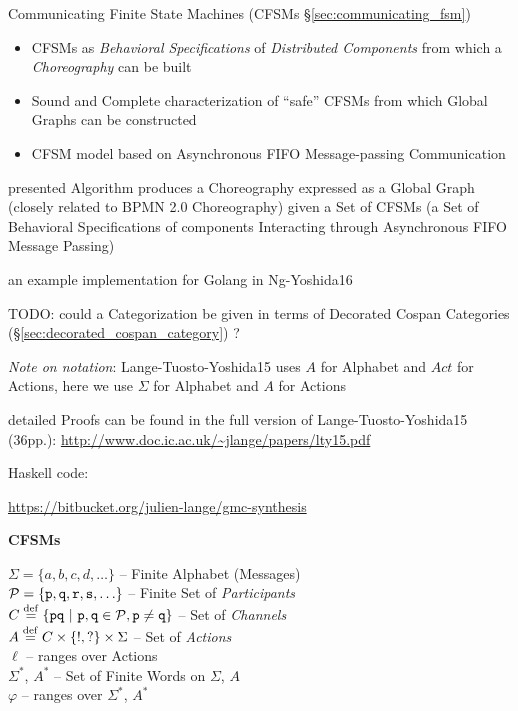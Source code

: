 \fist Communicating Finite State Machines (CFSMs
\S\ref{sec:communicating_fsm})

\begin{itemize}
\item CFSMs as \emph{Behavioral Specifications} of \emph{Distributed
  Components} from which a \emph{Choreography} can be built
\item Sound and Complete characterization of ``safe'' CFSMs from which
  Global Graphs can be constructed
\item CFSM model based on Asynchronous FIFO Message-passing
  Communication
\end{itemize}

presented Algorithm produces a Choreography expressed as a Global Graph
(closely related to BPMN 2.0 Choreography) given a Set of CFSMs (a Set
of Behavioral Specifications of components Interacting through
Asynchronous FIFO Message Passing)

\fist an example implementation for Golang in Ng-Yoshida16

TODO: could a Categorization be given in terms of Decorated Cospan
Categories (\S\ref{sec:decorated_cospan_category}) ?

\asterism

\emph{Note on notation}: Lange-Tuosto-Yoshida15 uses $A$ for
Alphabet and $Act$ for Actions, here we use $\Sigma$ for Alphabet and
$A$ for Actions

detailed Proofs can be found in the full version of
Lange-Tuosto-Yoshida15 (36pp.):
\url{http://www.doc.ic.ac.uk/~jlange/papers/lty15.pdf}

Haskell code:

\url{https://bitbucket.org/julien-lange/gmc-synthesis}


\textbf{CFSMs}

$\Sigma = \{ a,b,c,d,\ldots \}$ -- Finite Alphabet (Messages) \\
$\mathcal{P} = \{ \mathtt{p, q, r, s},\ldots\}$
-- Finite Set of \emph{Participants} \\
$C \stackrel{\mathrm{def}}= \{ \mathtt{pq}
  \ |\ \mathtt{p,q} \in \mathcal{P}, \mathtt{p \neq q} \}$
-- Set of \emph{Channels} \\
$A \stackrel{\mathrm{def}}= C \times \{!,?\} \times \Sigma$ -- Set of \emph{Actions} \\
$\ell$ -- ranges over Actions \\
$\Sigma^*$, $A^*$ -- Set of Finite Words on $\Sigma$, $A$ \\
$\varphi$ -- ranges over $\Sigma^*$, $A^*$ \\

